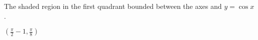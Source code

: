 {The shaded region in the first quadrant bounded between the axes and $y=\cos x$.\\

\noindent\begin{minipage}{\linewidth}
\centering
{}
\end{minipage}
}
{$\left( \frac{\pi}{2}-1, \frac{\pi}{8} \right)$
}
